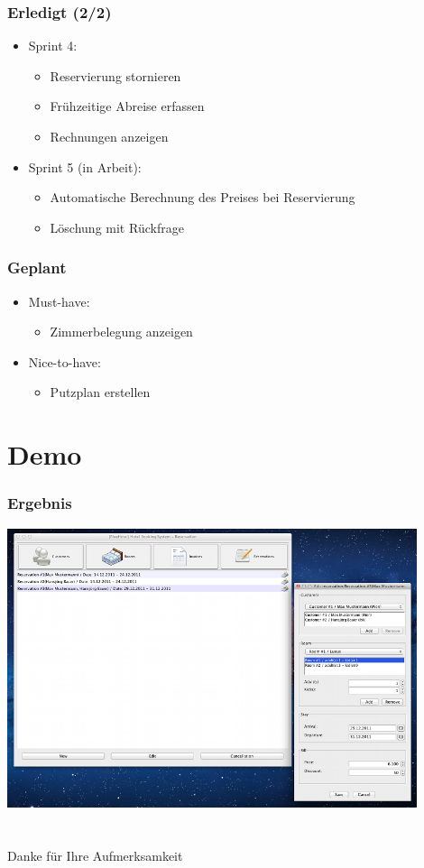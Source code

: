 \documentclass{beamer}
\begin{document}
\begin{frame}
\frametitle{Erledigt (2/2)} 
\begin{itemize}
\item  Sprint 4:
\begin{itemize}
\item  Reservierung stornieren
\item  Fr\"uhzeitige Abreise erfassen
\item  Rechnungen anzeigen
\end{itemize}
\item  Sprint 5 (in Arbeit):
\begin{itemize}
\item  Automatische Berechnung des Preises bei Reservierung
\item  L\"oschung mit R\"uckfrage
\end{itemize}
\end{itemize}
\end{frame}

\begin{frame}
\frametitle{Geplant} 
\begin{itemize}
\item  Must-have:
\begin{itemize}
\item  Zimmerbelegung anzeigen
\end{itemize}
\item  Nice-to-have:
\begin{itemize}
\item  Putzplan erstellen
\end{itemize}
\end{itemize}
\end{frame}

\section{Demo} 

\begin{frame}
\frametitle{Ergebnis} 
\begin{overprint}
\begin{center}
\includegraphics [width=0.9\textwidth] {img/demo.png}
\end{center}
\end{overprint}
\end{frame}

\section{} 

\begin{frame}
\begin{center}
Danke f\"ur Ihre Aufmerksamkeit
\end{center}
\end{frame}
\end{document}
